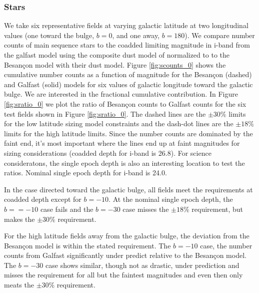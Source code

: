 \documentclass[]{article}
\begin{document}
\subsubsection{Stars}
We take six representative fields at varying galactic latitude at two longitudinal values (one toward the bulge, $b=0$, and one away, $b=180$).  
We compare number 
counts of main sequence stars to the coadded limiting magnitude in i-band 
 from the galfast model using the composite dust model
of \cite{amores} normalized to \cite{sfd} to the Besan\c{c}on \cite{besancon} model with their dust model.  Figure \ref{fig:scounts_0} shows 
the cumulative number counts as a function of magnitude for the Besan\c{c}on (dashed) and Galfast (solid) models 
for six values of galactic longitude toward the galactic bulge.  We are interested in the
fractional cumulative contribution.  In Figure \ref{fig:sratio_0} we plot the ratio of Besan\c{c}on counts to Galfast counts for the six test fields shown in Figure \ref{fig:sratio_0}.
The dashed lines are the $\pm30\%$ limits for the low latitude sizing model constraints and the dash-dot lines are the $\pm18\%$ limits for the high latitude limits.
Since the number counts are dominated by the faint end, it's most important where the lines end up at faint magnitudes for sizing considerations (coadded depth for i-band is 26.8).  For science consideratons, the single epoch depth is also an interesting location to test the ratios.  Nominal single epoch depth for i-band is 24.0.  

In the case directed toward the galactic bulge, all fields meet the requirements at coadded depth except
for $b=-10$.  At the nominal single epoch depth, the $b==-10$ case fails and the $b=-30$ case misses the $\pm18\%$
requirement, but makes the $\pm30\%$ requirement.

For the high latitude fields away from the galactic bulge, the deviation from the Besan\c{c}on model is within 
the stated requirement.  The $b=-10$ case, the number counts from Galfast significantly under predict relative to 
the Besan\c{c}on model.  The $b=-30$ case shows similar, though not as drastic, under prediction and misses the 
requirement for all but the faintest magnitudes and even then only meats the $\pm30\%$ requirement.
\end{document}
